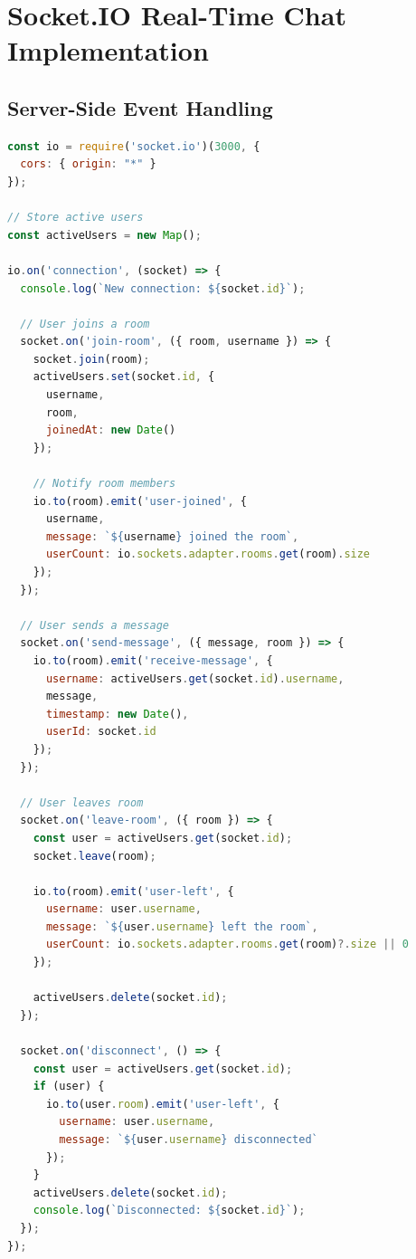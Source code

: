 
\section{Socket.IO Real-Time Chat Implementation}

\subsection{Server-Side Event Handling}

\begin{lstlisting}[language=JavaScript, caption=Socket.IO Server Setup]
const io = require('socket.io')(3000, {
  cors: { origin: "*" }
});

// Store active users
const activeUsers = new Map();

io.on('connection', (socket) => {
  console.log(`New connection: ${socket.id}`);

  // User joins a room
  socket.on('join-room', ({ room, username }) => {
    socket.join(room);
    activeUsers.set(socket.id, {
      username,
      room,
      joinedAt: new Date()
    });

    // Notify room members
    io.to(room).emit('user-joined', {
      username,
      message: `${username} joined the room`,
      userCount: io.sockets.adapter.rooms.get(room).size
    });
  });

  // User sends a message
  socket.on('send-message', ({ message, room }) => {
    io.to(room).emit('receive-message', {
      username: activeUsers.get(socket.id).username,
      message,
      timestamp: new Date(),
      userId: socket.id
    });
  });

  // User leaves room
  socket.on('leave-room', ({ room }) => {
    const user = activeUsers.get(socket.id);
    socket.leave(room);

    io.to(room).emit('user-left', {
      username: user.username,
      message: `${user.username} left the room`,
      userCount: io.sockets.adapter.rooms.get(room)?.size || 0
    });

    activeUsers.delete(socket.id);
  });

  socket.on('disconnect', () => {
    const user = activeUsers.get(socket.id);
    if (user) {
      io.to(user.room).emit('user-left', {
        username: user.username,
        message: `${user.username} disconnected`
      });
    }
    activeUsers.delete(socket.id);
    console.log(`Disconnected: ${socket.id}`);
  });
});
\end{lstlisting}

